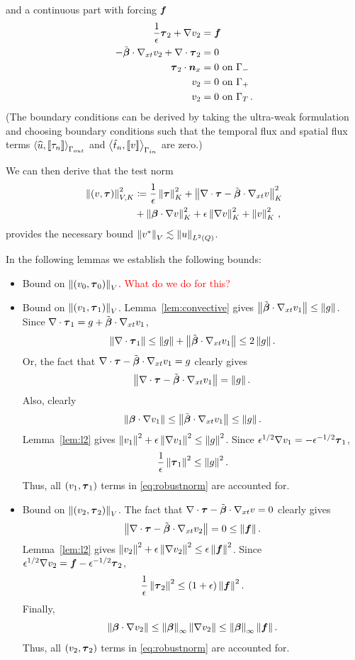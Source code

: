 \documentclass{article}
\begin{document}
and a continuous part with forcing $\boldsymbol f$
\begin{align*}
\frac{1}{\epsilon}\boldsymbol\tau_2+\nabla v_2 &=\boldsymbol f\\
-\tilde{\boldsymbol\beta}\cdot\nabla_{xt} v_2 + \nabla\cdot\boldsymbol\tau_2 &= 0\\
\boldsymbol\tau_2\cdot\boldsymbol n_x &= 0 \text{ on } \Gamma_-\\
v_2 &= 0 \text{ on } \Gamma_+\\
v_2 &= 0 \text{ on } \Gamma_T\,.
\end{align*}
(The boundary conditions can be derived by taking the ultra-weak formulation and choosing boundary conditions such that the temporal flux and spatial flux terms $\left\langle \widehat{u}, \left[ \![\tau_n]\! \right] \right\rangle_{\Gamma_{out}}$ and $\left\langle \hat t_n,\left[ \![v]\! \right] \right\rangle_{\Gamma_{in}}$ are zero.)

We can then derive that the test norm
\begin{align}
\label{eq:robustnorm}
\left\| \left( v,\boldsymbol\tau \right) \right\|_{V,K}^2 &\coloneqq
\frac{1}{\epsilon}\left\| \boldsymbol\tau \right\|_K^2
+ \left\| \nabla\cdot \boldsymbol\tau - \tilde{\boldsymbol\beta}\cdot\nabla_{xt} v \right\|_K^2 \nonumber\\
&+\left\| \boldsymbol\beta\cdot \nabla v \right\|_K^2
+ \epsilon\left\| \nabla v \right\|_K^2
+ \left\| v \right\|^2_K\,,
\end{align}
provides the necessary bound $\left\| v^* \right\|_V \lesssim \left\| u \right\|_{L^2\left( Q \right)}$.

In the following lemmas we establish the following bounds:
\begin{itemize}
\item Bound on $\left\| \left( v_0,\boldsymbol\tau_0 \right) \right\|_V$. \textcolor{red}{What do we do for this?}
\item Bound on $\left\| \left( v_1,\boldsymbol\tau_1 \right) \right\|_V$. 
Lemma~\ref{lem:convective} gives $\left\| \tilde{\boldsymbol\beta}\cdot\nabla_{xt} v_1 \right\|\leq\left\| g \right\|$.
Since $\nabla\cdot\boldsymbol\tau_1=g+\tilde{\boldsymbol\beta}\cdot\nabla_{xt} v_1$, 
\[
\left\| \nabla\cdot\boldsymbol\tau_1 \right\|\leq\left\| g \right\|+\left\| \tilde{\boldsymbol\beta}\cdot\nabla_{xt} v_1 \right\|\leq 2\left\| g \right\|.
\]
Or, the fact that $\nabla\cdot\boldsymbol\tau-\tilde{\boldsymbol\beta}\cdot\nabla_{xt} v_1=g$ clearly gives
\[
\left\| \nabla\cdot \boldsymbol\tau - \tilde{\boldsymbol\beta}\cdot\nabla_{xt} v_1 \right\|=\left\| g \right\|.
\]
Also, clearly
\[
\left\| \boldsymbol\beta\cdot\nabla v_1 \right\|\leq\left\| \tilde{\boldsymbol\beta}\cdot\nabla_{xt} v_1 \right\|\leq\left\| g \right\|.
\]
Lemma~\ref{lem:l2} gives $\left\| v_1 \right\|^2+\epsilon\left\| \nabla v_1 \right\|^2\leq\left\| g \right\|^2$.
Since $\epsilon^{1/2}\nabla v_1=-\epsilon^{-1/2}\boldsymbol\tau_1$,
\[
\frac{1}{\epsilon}\left\| \boldsymbol\tau_1 \right\|^2\leq\left\| g \right\|^2.
\]
Thus, all $(v_1,\boldsymbol\tau_1)$ terms in \eqref{eq:robustnorm} are accounted for.
\item Bound on $\left\| \left( v_2,\boldsymbol\tau_2 \right) \right\|_V$. 
The fact that $\nabla\cdot\boldsymbol\tau-\tilde{\boldsymbol\beta}\cdot\nabla_{xt} v=0$ clearly gives
\[
\left\| \nabla\cdot \boldsymbol\tau - \tilde{\boldsymbol\beta}\cdot\nabla_{xt} v_2 \right\|=0\leq\left\| \boldsymbol f \right\|.
\]
Lemma~\ref{lem:l2} gives $\left\| v_2 \right\|^2+\epsilon\left\| \nabla v_2 \right\|^2\leq\epsilon\left\| \boldsymbol f \right\|^2$.
Since $\epsilon^{1/2}\nabla v_2=\boldsymbol f-\epsilon^{-1/2}\boldsymbol\tau_2$,
\[
\frac{1}{\epsilon}\left\| \boldsymbol\tau_2 \right\|^2\leq(1+\epsilon)\left\| \boldsymbol f \right\|^2.
\]
Finally,
\[
\left\| \boldsymbol\beta\cdot\nabla v_2 \right\|\leq\left\| \boldsymbol\beta \right\|_\infty\left\| \nabla v_2 \right\|\leq\left\| \boldsymbol\beta \right\|_\infty\left\| \boldsymbol f \right\|.
\]
Thus, all $(v_2,\boldsymbol\tau_2)$ terms in \eqref{eq:robustnorm} are accounted for.
\end{itemize}
\end{document}
